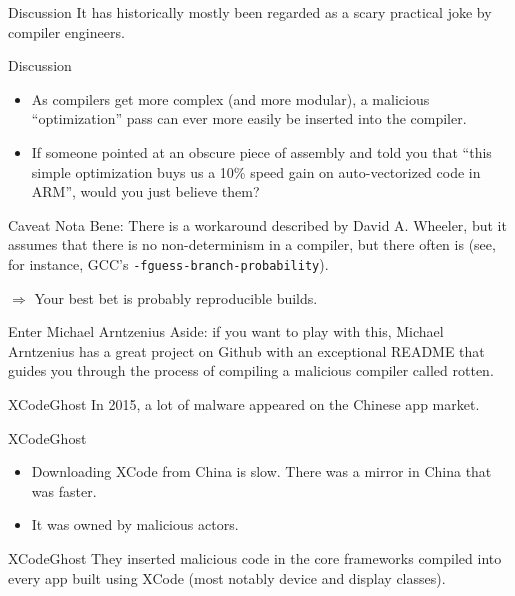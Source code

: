 \documentclass[aspectratio=169]{beamer}
\begin{document}
  \begin{frame}{Discussion}
      It has historically mostly been regarded as a scary practical joke
      by compiler engineers.
  \end{frame}
  \begin{frame}{Discussion}
    \begin{itemize}
      \item As compilers get more complex (and more modular), a malicious
            “optimization” pass can ever more easily be inserted into the
            compiler.
      \item If someone pointed at an obscure piece of assembly and told you
            that “this simple optimization buys us a 10\% speed gain on
            auto-vectorized code in ARM”, would you just believe them?
    \end{itemize}
  \end{frame}
  \begin{frame}{Caveat}
    Nota Bene: There is a workaround described by David A. Wheeler, but it
    assumes that there is no non-determinism in a compiler, but there often is
    (see, for instance, GCC’s \texttt{-fguess-branch-probability}).

    $\Rightarrow$ Your best bet is probably reproducible builds.
  \end{frame}
  \begin{frame}{Enter Michael Arntzenius}
    Aside: if you want to play with this, Michael Arntzenius has a great project
    on Github with an exceptional README that guides you through the process of
    compiling a malicious compiler called rotten.
  \end{frame}
  \begin{frame}{XCodeGhost}
    In 2015, a lot of malware appeared on the Chinese app market.
  \end{frame}
  \begin{frame}{XCodeGhost}
    \begin{itemize}
      \item Downloading XCode from China is slow. There was a mirror in China
            that was faster.
      \item It was owned by malicious actors.
    \end{itemize}
  \end{frame}
  \begin{frame}{XCodeGhost}
    They inserted malicious code in the core frameworks compiled into every app
    built using XCode (most notably device and display classes).
  \end{frame}
\end{document}
